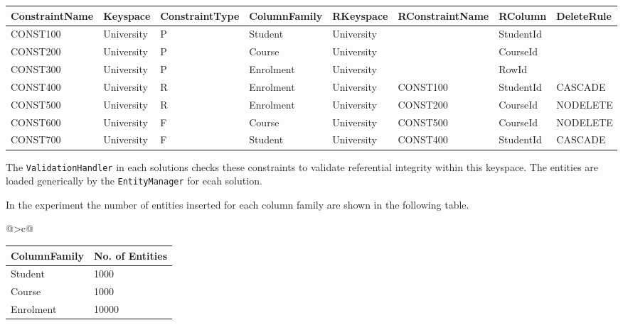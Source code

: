 	
	\begin{tabular}{CCC CCC CC}
		\toprule
		\bfseries ConstraintName & \bfseries Keyspace & \bfseries ConstraintType &
		\bfseries ColumnFamily & \bfseries RKeyspace & \bfseries RConstraintName &
		\bfseries RColumn & \bfseries DeleteRule\\
		\midrule
		CONST100 & University & P & Student & University & & StudentId &\\
		\rc CONST200 & University & P & Course & University & & CourseId &\\
		CONST300 & University & P & Enrolment & University & & RowId &\\
		\rc CONST400 & University & R & Enrolment & University & CONST100 & StudentId
		& CASCADE\\
		CONST500 & University & R & Enrolment & University & CONST200 & CourseId &
		NODELETE\\
		\rc CONST600 & University & F & Course & University & CONST500 & CourseId &
		NODELETE\\
		CONST700 & University & F & Student & University & CONST400 & StudentId &
		CASCADE\\
		\bottomrule
	\end{tabular}
	

The \texttt{ValidationHandler} in each solutions checks these constraints to
validate referential integrity within this keyspace. The entities are loaded
generically by the \texttt{EntityManager} for ecah solution.

In the experiment the number of entities inserted for each column family are
shown in the following table.
	\newline
	\begin{center}
	\newcolumntype{C} {@{\hspace{2.5pt}}>{\scriptsize}c@{\hspace{2.5pt}}}
		\begin{tabular}{CC}
			
			\toprule
			\bfseries ColumnFamily & \bfseries No. of Entities \\
			\midrule
			Student & 1000 \\
			\rc Course & 1000 \\
			Enrolment & 10000  \\
			
			\bottomrule
		\end{tabular}
	\end{center}

